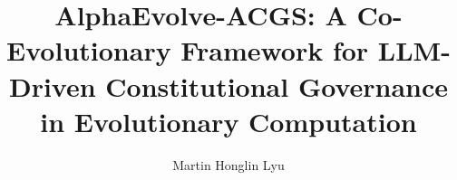 \documentclass[sigconf]{acmart} %
\begin{document}
\balance %

\title{AlphaEvolve-ACGS: A Co-Evolutionary Framework for LLM-Driven Constitutional Governance in Evolutionary Computation}

\author{Martin Honglin Lyu}


\renewcommand{\shortauthors}{Lyu} %
\end{document}
